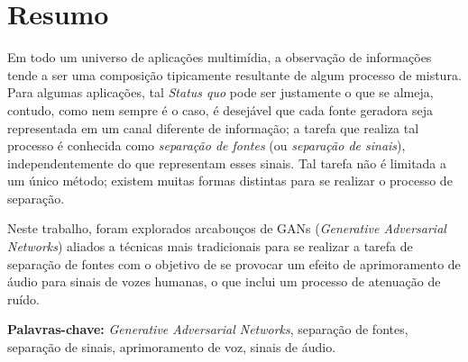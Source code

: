 \chapter*{Resumo}

Em todo um universo de aplicações multimídia, a observação de informações tende a ser uma composição tipicamente resultante de algum processo de mistura. Para algumas aplicações, tal \textit{Status quo} pode ser justamente o que se almeja, contudo, como nem sempre é o caso, é desejável que cada fonte geradora seja representada em um canal diferente de informação; a tarefa que realiza tal processo é conhecida como \textit{separação de fontes} (ou \textit{separação de sinais}), independentemente do que representam esses sinais. Tal tarefa não é limitada a um único método; existem muitas formas distintas para se realizar o processo de separação.

Neste trabalho, foram explorados arcabouços de GANs (\textit{Generative Adversarial Networks}) aliados a técnicas mais tradicionais para se realizar a tarefa de separação de fontes com o objetivo de se provocar um efeito de aprimoramento de áudio para sinais de vozes humanas, o que inclui um processo de atenuação de ruído.

\vspace{2.0cm}

\noindent \textbf{Palavras-chave:} \hspace{1.0cm} \textit{Generative Adversarial Networks}, separação de fontes, separação de sinais, aprimoramento de voz, sinais de áudio.
